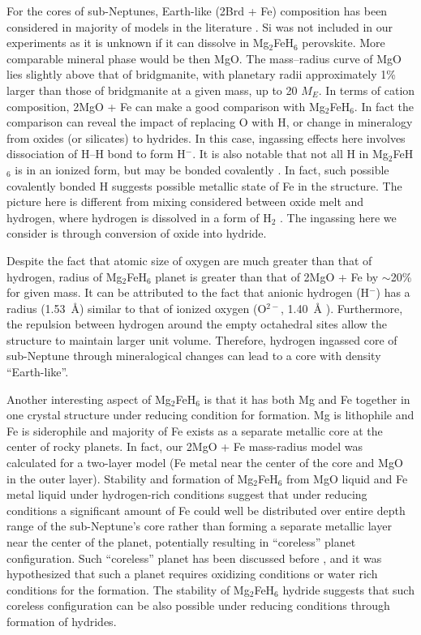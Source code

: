 \documentclass[draft,jgrga,12pt]{agujournal2019}
\begin{document}
For the cores of sub-Neptunes, Earth-like (2Brd + Fe) composition has been considered in majority of models in the literature \cite{valencia_internal_2006, sotin_mass_2007, zeng_detailed_2013}.
Si was not included in our experiments as it is unknown if it can dissolve in Mg$_2$FeH$_6$ perovskite.  
More comparable mineral phase would be then MgO.
The mass–radius curve of MgO lies slightly above that of bridgmanite, with planetary radii approximately 1\% larger than those of bridgmanite at a given mass, up to 20 $M_E$.
In terms of cation composition, 2MgO + Fe can make a good comparison with Mg$_2$FeH$_6$.
In fact the comparison can reveal the impact of replacing O with H, or change in mineralogy from oxides (or silicates) to hydrides.
In this case, ingassing effects here involves dissociation of H--H bond to form H$^{-}$.  
It is also notable that not all H in Mg$_2$FeH$_6$ is in an ionized form, but may be bonded covalently \cite{retuerto_neutron_2015}.
In fact, such possible covalently bonded H suggests possible metallic state of Fe in the structure.
The picture here is different from mixing considered between oxide melt and hydrogen, where hydrogen is dissolved in a form of H$_2$ \cite{gilmore_core_2026}.
The ingassing here we consider is through conversion of oxide into hydride.

Despite the fact that atomic size of oxygen are much greater than that of hydrogen, radius of Mg$_2$FeH$_6$ planet is greater than that of 2MgO + Fe by $\sim$20\% for given mass.  
It can be attributed to the fact that anionic hydrogen (H$^{-}$) has a radius (1.53~{\AA}) similar to that of ionized oxygen (O$^{2-}$, 1.40~{\AA} \cite{shannon_effective_1969}).
Furthermore, the repulsion between hydrogen  around the empty octahedral sites allow the structure to maintain larger unit volume.
Therefore, hydrogen ingassed core of sub-Neptune through mineralogical changes can lead to a core with density  ``Earth-like''.

Another interesting aspect of Mg$_2$FeH$_6$ is that it has both Mg and Fe together in one crystal structure under reducing condition for formation.
Mg is lithophile and Fe is siderophile and majority of Fe exists as a separate metallic core at the center of rocky planets.
In fact, our 2MgO + Fe mass-radius model was calculated for a two-layer model (Fe metal near the center of the core and MgO in the outer layer). 
Stability and formation of Mg$_2$FeH$_6$ from MgO liquid and Fe metal liquid under hydrogen-rich conditions suggest that under reducing conditions a significant amount of Fe could well be distributed over entire depth range of the sub-Neptune's core rather than forming a separate metallic layer near the center of the planet, potentially resulting in ``coreless'' planet configuration.
Such ``coreless'' planet has been discussed before \cite{elkins-tanton_coreless_2008}, and it was hypothesized that such a planet requires oxidizing conditions or water rich conditions for the formation.  
The stability of Mg$_2$FeH$_6$ hydride suggests that such coreless configuration can be also possible under reducing conditions through formation of hydrides.
\end{document}
